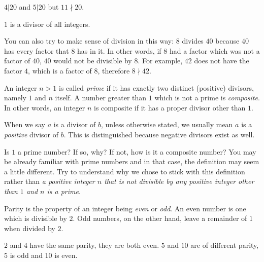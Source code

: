 \documentclass{subfile}
\begin{document}
	\begin{example}
		$4|20$ and $5|20$ but $11\nmid 20$.
	\end{example}

	\begin{example}
		$1$ is a divisor of all integers.
	\end{example}

	You can also try to make sense of division in this way: $8$ divides $40$ because $40$ has every factor that $8$ has in it. In other words, if $8$ had a factor which was not a factor of $40$, $40$ would not be divisible by $8$. For example, $42$ does not have the factor $4$, which is a factor of $8$, therefore $8 \nmid 42$.

	\begin{definition}
		An integer $n>1$ is called \textit{prime} if it has exactly two distinct (positive) divisors, namely $1$ and $n$ itself. A number greater than $1$ which is not a prime is \textit{composite}. In other words, an integer $n$ is composite if it has a proper divisor other than $1$.
	\end{definition}

	\begin{note}
		When we say $a$ is a divisor of $b$, unless otherwise stated, we usually mean $a$ is a \textit{positive} divisor of $b$. This is distinguished because negative divisors exist as well.
	\end{note}

	\begin{question}
		Is $1$ a prime number? If so, why? If not, how is it a composite number? You may be already familiar with prime numbers and in that case, the definition may seem a little different. Try to understand why we chose to stick with this definition rather than \textit{a positive integer $n$ that is not divisible by any positive integer other than $1$ and $n$ is a prime}.
	\end{question}

	\begin{definition}[Parity]
		Parity is the property of an integer being {\it even} or {\it odd}. An even number is one which is divisible by $2$. Odd numbers, on the other hand, leave a remainder of $1$ when divided by $2$.
	\end{definition}

	\begin{example}
		$2$ and $4$ have the same parity, they are both even. $5$ and $10$ are of different parity, $5$ is odd and $10$ is even.
	\end{example}
\end{document}
